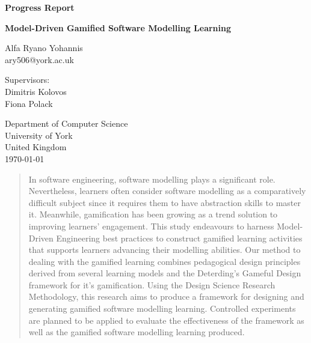 \documentclass[12pt, a4paper]{report} \usepackage[titletoc]{appendix}
\begin{document}
\begin{titlepage}
 \begin{center}

\textbf{Progress Report}
\vspace{1cm}

\textbf{\large Model-Driven Gamified Software Modelling Learning}
\vspace{1cm}

Alfa Ryano Yohannis\\
ary506@york.ac.uk
\vspace{1cm}

Supervisors:\\
Dimitris Kolovos\\
Fiona Polack\\
\vspace{1cm}

Department of Computer Science\\
University of York\\
United Kingdom\\
\vspace{1cm}
\today
 
\vfill
 
\end{center}
\end{titlepage}


\begin{abstract}
In software engineering, software modelling plays a significant role.
Nevertheless, learners often consider software modelling as a comparatively 
difficult subject since it requires them to have abstraction skills to master it. Meanwhile, gamification has been growing as a trend solution to improving learners' engagement. This study endeavours to harness Model-Driven Engineering best practices to construct gamified learning activities that supports learners advancing their modelling abilities. Our method to dealing with the gamified learning combines pedagogical design principles derived from several learning models and the Deterding's Gameful Design framework for it's gamification. Using the Design Science Research Methodology, this research aims to produce a framework for designing and generating gamified software modelling learning. Controlled experiments are planned to be applied to evaluate the effectiveness of the framework as well as the gamified software modelling learning produced.
\end{abstract}

\tableofcontents
{}
\end{document}
